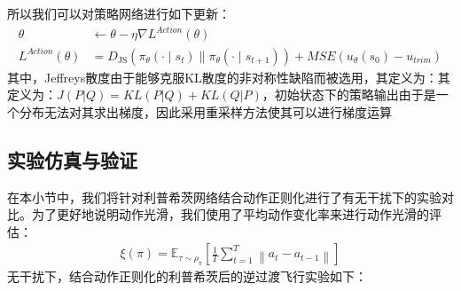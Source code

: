 所以我们可以对策略网络进行如下更新：
\begin{align}
    \theta &\leftarrow \theta-\eta \nabla L^{Action}(\theta)\\
    L^{Action}(\theta)&={D}_{\mathrm{JS}}\left(\pi_{\theta}(\cdot \mid s_{t}) \| \pi_{\theta}(\cdot \mid s_{t+1})\right)+MSE(u_{\theta}(s_{0})-u_{trim})
\end{align}
其中，Jeffreys散度由于能够克服KL散度的非对称性缺陷而被选用，其定义为：其定义为：$J(P|Q) = KL(P|Q)+KL(Q|P)$，初始状态下的策略输出由于是一个分布无法对其求出梯度，因此采用重采样方法使其可以进行梯度运算
\subsection{实验仿真与验证}
在本小节中，我们将针对利普希茨网络结合动作正则化进行了有无干扰下的实验对比。为了更好地说明动作光滑，我们使用了平均动作变化率来进行动作光滑的评估：
\begin{align}
    \xi(\pi)  = \mathbb{E}_{\tau \sim \rho_{\pi}}\left[\frac{1}{T} \sum_{t = 1}^{T}\left\|a_{t}-a_{t-1}\right\|\right]
    \end{align}
无干扰下，结合动作正则化的利普希茨后的逆过渡飞行实验如下：
